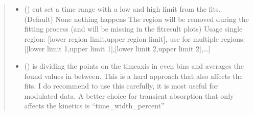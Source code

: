 \documentclass[letterpaper,10pt,english]{sphinxmanual}
\begin{document}
\begin{fulllineitems}
\begin{quote}
\begin{description}
\begin{itemize}
\item {} 
 (\sphinxstyleliteralemphasis{\sphinxupquote{ (}}\sphinxstyleliteralemphasis{\sphinxupquote{)}}\sphinxstyleliteralemphasis{\sphinxupquote{, }}) \textendash{} cut set a time range with a low and high limit from the fits. (Default) None nothing happens
The region will be removed during the fitting process (and will be missing in the fit\sphinxhyphen{}result
plots)
Usage single region: {[}lower region limit,upper region limit{]},
use for multiple regions:{[}{[}lower limit 1,upper limit 1{]},{[}lower limit 2,upper limit 2{]},…{]}

\item {} 
 (\sphinxstyleliteralemphasis{\sphinxupquote{, }}) \textendash{} is dividing the points on the time\sphinxhyphen{}axis in even bins and averages the found values in between.
This is a hard approach that also affects the fits. I do recommend to use this carefully,
it is most useful for modulated data. A better choice for transient absorption that only
affects the kinetics is “time\_width\_percent”


\end{itemize}
\end{description}
\end{quote}
\end{fulllineitems}
\end{document}
